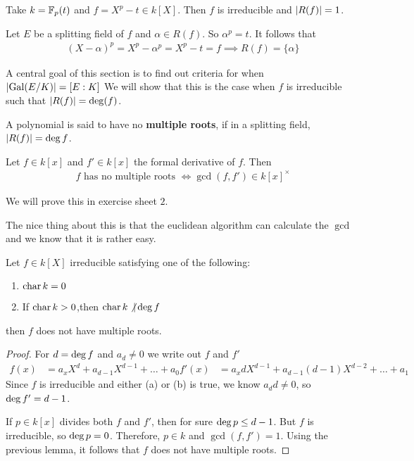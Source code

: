 \begin{ex}[]
  Take $k = \mathbb{F}_p(t)$ and $f = X^{p} - t \in k[X]$. Then $f$ is irreducible and $\vert R(f)\vert = 1$.

  Let $E$ be a splitting field of $f$ and $\alpha \in R(f)$. So $\alpha^{p} = t$. It follows that
  \begin{align*}
    (X - \alpha)^{p} = X^{p} - \alpha^{p} = X^{p} - t = f \implies R(f) = \{\alpha\}
  \end{align*}
\end{ex}

A central goal of this section is to find out criteria for when $\abs{\Gal(E/K)} = [E:K]$
We will show that this is the case when $f$ is irreducible such that $\vert R(f)\vert = \operatorname{deg}(f)$.

\begin{dfn}[]
  A polynomial is said to have no \textbf{multiple roots}, if in a splitting field, $\vert R(f)\vert = \operatorname{deg} f$.
\end{dfn}

\begin{lem}[]
  Let $f \in k[x]$ and $f'\in k[x]$ the formal derivative of $f$. Then
  \begin{align*}
    f \text{ has no multiple roots } \iff \gcd(f,f') \in k[x]^{\times}
  \end{align*}
\end{lem}
We will prove this in exercise sheet $2$.

The nice thing about this is that the euclidean algorithm can calculate the $\gcd$ and we know that it is rather easy.

\begin{cor}
  Let $f \in k[X]$ irreducible satisfying one of the following:
  \begin{enumerate}
    \item $\operatorname{char} k = 0$
    \item If $\operatorname{char} k > 0$,then $\operatorname{char} k \not| \operatorname{deg} f$
  \end{enumerate}
  then $f$ does not have multiple roots.
\end{cor}
\begin{proof}
  For $d = \operatorname{deg} f$ and $a_d \neq 0$ we write out $f$ and $f'$
  \begin{align*}
    f(x) &= a_xX^{d} + a_{d-1}X^{d-1} + \ldots + a_0
    f'(x) &= a_xdX^{d-1} + a_{d-1}(d-1)X^{d-2} + \ldots + a_1
  \end{align*}
  Since $f$ is irreducible and either (a) or (b) is true, we know $a_d d \neq 0$, so $\operatorname{deg} f' = d-1$.

  If $p \in k[x]$ divides both $f$ and $f'$, then for sure $\operatorname{deg} p \leq d -1$. But $f$ is irreducible, so $\operatorname{deg} p = 0$.
  Therefore, $p \in k$ and $\gcd(f,f') = 1$. Using the previous lemma, it follows that $f$ does not have multiple roots.
\end{proof}


